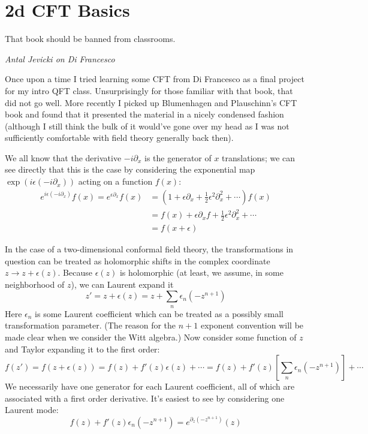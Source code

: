\documentclass{report}
\begin{document}
\section{2d CFT Basics}
\epigraph{That book should be banned from classrooms.}{\textit{Antal Jevicki on 
Di Francesco}}

Once upon a time I tried learning some CFT from Di Francesco as a final project
for my intro QFT class. Unsurprisingly for those familiar with that book, 
that did not go well. More recently I picked up Blumenhagen and Plauschinn's 
CFT book and found that it presented the material in a nicely condensed fashion 
(although I still think the bulk of it would've gone over my head as I was 
not sufficiently comfortable with field theory generally back then).

We all know that the derivative $ -i \partial_x $ is the generator of $ x $ translations; 
we can see directly that this is the case by considering the exponential map 
$ \exp(i \epsilon (-i\partial_x) ) $ acting on a function $ f(x) $: 
\begin{align}
	e^{i\epsilon(-i\partial_x)}f(x) 
		= e^{\epsilon \partial_x} f(x) \nonumber
		&= (1+\epsilon \partial_x + \frac{1}{2}\epsilon^2 \partial_x^2 + \cdots)f(x) \nonumber \\
		&= f(x) + \epsilon \partial_x f + \frac{1}{2} \epsilon^2 \partial^2_x  + \cdots \nonumber\\
		&= f(x + \epsilon) \label{eq:cft-shift}
\end{align}

In the case of a two-dimensional conformal field theory, the transformations in 
question can be treated as holomorphic shifts in the complex coordinate $ z
\rightarrow z + \epsilon(z) $. Because $ \epsilon(z) $ is holomorphic (at least, 
we assume, in some neighborhood of $ z $), we can Laurent expand it 
\begin{equation*}
	z' = z + \epsilon(z) = z + \sum_n \epsilon_n(-z^{n+1})
\end{equation*}
Here $\epsilon_n $ is some Laurent coefficient which can be treated as a possibly 
small transformation parameter. (The reason for the $ n+1 $ exponent convention 
will be made clear when we consider the Witt algebra.)
Now consider some function of $ z $ and Taylor expanding it to the first order: 
\begin{equation*}
	f(z') = f(z+\epsilon(z)) 
		= f(z) + f'(z) \epsilon(z) + \cdots
		= f(z) + f'(z) \left[\sum_n \epsilon_n (-z^{n+1})\right] + \cdots
\end{equation*}
We necessarily have one generator for each Laurent coefficient, all of which 
are associated with a first order derivative. It's easiest to see by considering 
one Laurent mode: 
\begin{equation*}
	f(z) + f'(z) \epsilon_n(-z^{n+1}) = e^{\partial_z (-z^{n+1})} (z)
\end{equation*}
\end{document}
